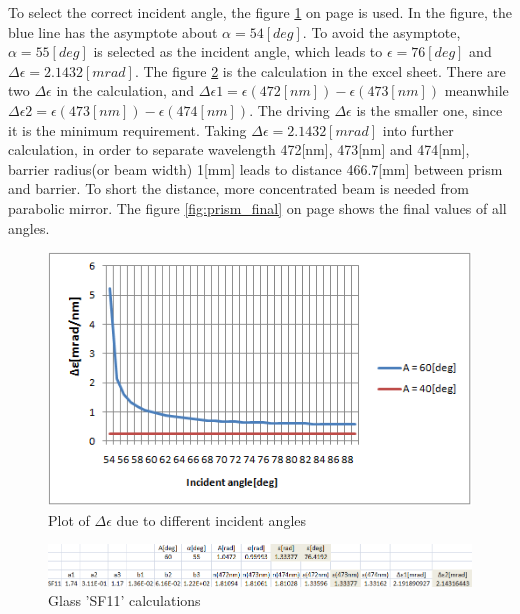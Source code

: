 To select the correct incident angle, the figure \ref{fig:prism_alpha} on page \pageref{fig:prism_alpha} is used. In the figure, the blue line has the asymptote about $\alpha = 54[deg]$. To avoid the asymptote, $\alpha = 55[deg]$ is selected as the incident angle, which leads to $\epsilon = 76[deg]$ and $\Delta\epsilon = 2.1432[mrad]$. The figure \ref{fig:SF11} is the calculation in the excel sheet. There are two $\Delta\epsilon$ in the calculation, and $\Delta\epsilon1 = \epsilon(472[nm]) - \epsilon(473[nm])$ meanwhile $\Delta\epsilon2 = \epsilon(473[nm]) - \epsilon(474[nm])$. The driving $\Delta\epsilon$ is the smaller one, since it is the minimum requirement. Taking $\Delta\epsilon = 2.1432[mrad]$ into further calculation, in order to separate wavelength 472[nm], 473[nm] and 474[nm], barrier radius(or beam width) 1[mm] leads to distance 466.7[mm] between prism and barrier. To short the distance, more concentrated beam is needed from parabolic mirror. The figure \ref{fig:prism_final} on page \pageref{fig:prism_final} shows the final values of all angles.

\begin{figure}[ht!]
\centering
\includegraphics[scale = 1.2]{chapters/img/prism_alpha.png}
\caption{Plot of $\Delta\epsilon$ due to different incident angles}
\label{fig:prism_alpha}
\end{figure}

\begin{figure}[ht!]
\centering
\includegraphics[scale = 0.8]{chapters/img/SF11.png}
\caption{Glass 'SF11' calculations}
\label{fig:SF11}
\end{figure}

